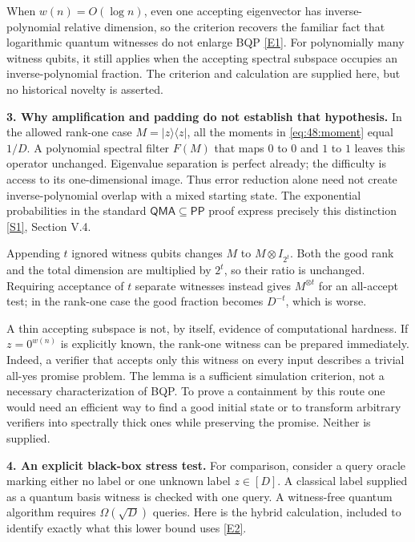 \documentclass[11pt,a4paper]{article}
\newcommand{\sref}[2]{\hyperlink{source:#1:#2}{[S#2]}}
\newcommand{\eref}[2]{\hyperlink{extra:#1:#2}{[E#2]}}
\numberwithin{equation}{section}
\begin{document}
When $w(n)=O(\log n)$, even one accepting eigenvector has inverse-polynomial
relative dimension, so the criterion recovers the familiar fact that
logarithmic quantum witnesses do not enlarge BQP \eref{48}{1}. For
polynomially many witness qubits, it still applies when the accepting
spectral subspace occupies an inverse-polynomial fraction. The criterion
and calculation are supplied here, but no historical novelty is asserted.

\textbf{3. Why amplification and padding do not establish that hypothesis.}
In the allowed rank-one case $M=|z\rangle\langle z|$, all the moments in
\eqref{eq:48:moment} equal $1/D$. A polynomial spectral filter $F(M)$
that maps $0$ to $0$ and $1$ to $1$ leaves this operator unchanged.
Eigenvalue separation is perfect already; the difficulty is access to its
one-dimensional image. Thus error reduction alone need not create
inverse-polynomial overlap with a mixed starting state. The exponential
probabilities in the standard $\mathsf{QMA}\subseteq\mathsf{PP}$ proof
express precisely this distinction \sref{48}{1}, Section V.4.

Appending $t$ ignored witness qubits changes $M$ to $M\otimes I_{2^t}$.
Both the good rank and the total dimension are multiplied by $2^t$, so
their ratio is unchanged. Requiring acceptance of $t$ separate witnesses
instead gives $M^{\otimes t}$ for an all-accept test; in the rank-one case
the good fraction becomes $D^{-t}$, which is worse.

A thin accepting subspace is not, by itself, evidence of computational
hardness. If $z=0^{w(n)}$ is explicitly known, the rank-one witness can be
prepared immediately. Indeed, a verifier that accepts only this witness on
every input describes a trivial all-yes promise problem. The lemma is a
sufficient simulation criterion, not a necessary characterization of BQP.
To prove a containment by this route one would need an efficient way to
find a good initial state or to transform arbitrary verifiers into
spectrally thick ones while preserving the promise. Neither is supplied.

\textbf{4. An explicit black-box stress test.}
For comparison, consider a query oracle marking either no label or one
unknown label $z\in[D]$. A classical label supplied as a quantum basis
witness is checked with one query. A witness-free quantum algorithm requires
$\Omega(\sqrt D)$ queries. Here is the hybrid calculation, included to
identify exactly what this lower bound uses \eref{48}{2}.
\end{document}
